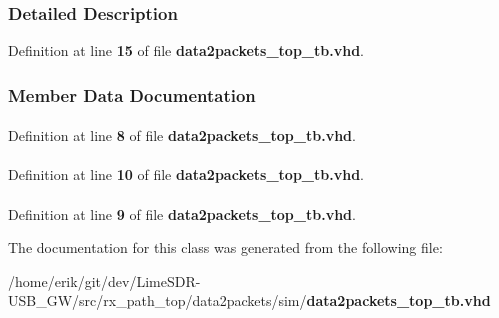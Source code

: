 \subsubsection{Detailed Description}


Definition at line {\bf 15} of file {\bf data2packets\+\_\+top\+\_\+tb.\+vhd}.



\subsubsection{Member Data Documentation}
\paragraph[{ieee}]{\hspace{0.3cm}{\ttfamily [Library]}}\label{classdata2packets__top__tb_a0a6af6eef40212dbaf130d57ce711256}


Definition at line {\bf 8} of file {\bf data2packets\+\_\+top\+\_\+tb.\+vhd}.

\paragraph[{numeric\+\_\+std}]{\hspace{0.3cm}{\ttfamily [Package]}}\label{classdata2packets__top__tb_a2edc34402b573437d5f25fa90ba4013e}


Definition at line {\bf 10} of file {\bf data2packets\+\_\+top\+\_\+tb.\+vhd}.

\paragraph[{std\+\_\+logic\+\_\+1164}]{\hspace{0.3cm}{\ttfamily [Package]}}\label{classdata2packets__top__tb_acd03516902501cd1c7296a98e22c6fcb}


Definition at line {\bf 9} of file {\bf data2packets\+\_\+top\+\_\+tb.\+vhd}.



The documentation for this class was generated from the following file\+:\begin{DoxyCompactItemize}
\item 
/home/erik/git/dev/\+Lime\+S\+D\+R-\/\+U\+S\+B\+\_\+\+G\+W/src/rx\+\_\+path\+\_\+top/data2packets/sim/{\bf data2packets\+\_\+top\+\_\+tb.\+vhd}\end{DoxyCompactItemize}
